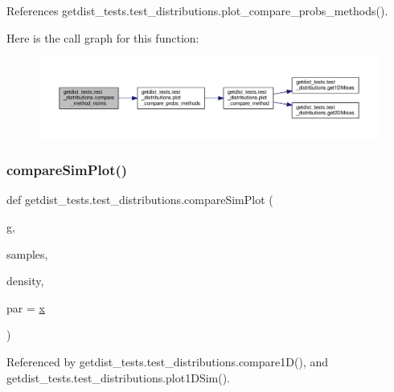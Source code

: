 References getdist\+\_\+tests.\+test\+\_\+distributions.\+plot\+\_\+compare\+\_\+probs\+\_\+methods().

Here is the call graph for this function\+:
\nopagebreak
\begin{figure}[H]
\begin{center}
\leavevmode
\includegraphics[width=350pt]{namespacegetdist__tests_1_1test__distributions_a8a3af891fac318ff66848b94c79a8a17_cgraph}
\end{center}
\end{figure}
\mbox{\label{namespacegetdist__tests_1_1test__distributions_a52f500d4237fe1a9b8698c71102c025d}} 
\subsubsection{\texorpdfstring{compare\+Sim\+Plot()}{compareSimPlot()}}
{\footnotesize\ttfamily def getdist\+\_\+tests.\+test\+\_\+distributions.\+compare\+Sim\+Plot (\begin{DoxyParamCaption}\item[{}]{g,  }\item[{}]{samples,  }\item[{}]{density,  }\item[{}]{par = {\ttfamily \textquotesingle{}\mbox{\hyperlink{plotTT_8m_a9336ebf25087d91c818ee6e9ec29f8c1}{x}}\textquotesingle{}} }\end{DoxyParamCaption})}



Referenced by getdist\+\_\+tests.\+test\+\_\+distributions.\+compare1\+D(), and getdist\+\_\+tests.\+test\+\_\+distributions.\+plot1\+D\+Sim().

